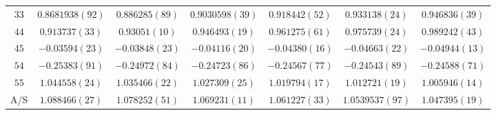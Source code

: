 \begin{table}
\begin{center}
\begin{tabular}{c|c c c c c c}
$33$ & $0.8681938(92)$ & $0.886285(89)$ & $0.9030598(39)$ & $0.918442(52)$ & $0.933138(24)$ & $0.946836(39)$ \\
$44$ & $0.913737(33)$ & $0.93051(10)$ & $0.946493(19)$ & $0.961275(61)$ & $0.975739(24)$ & $0.989242(43)$ \\
$45$ & $-0.03594(23)$ & $-0.03848(23)$ & $-0.04116(20)$ & $-0.04380(16)$ & $-0.04663(22)$ & $-0.04944(13)$ \\
$54$ & $-0.25383(91)$ & $-0.24972(84)$ & $-0.24723(86)$ & $-0.24567(77)$ & $-0.24543(89)$ & $-0.24588(71)$ \\
$55$ & $1.044558(24)$ & $1.035466(22)$ & $1.027309(25)$ & $1.019794(17)$ & $1.012721(19)$ & $1.005946(14)$ \\
\hline
A/S & $1.088466(27)$ & $1.078252(51)$ & $1.069231(11)$ & $1.061227(33)$ & $1.0539537(97)$ & $1.047395(19)$ \\
\hline
\hline
\end{tabular}
\end{center}
\end{table}